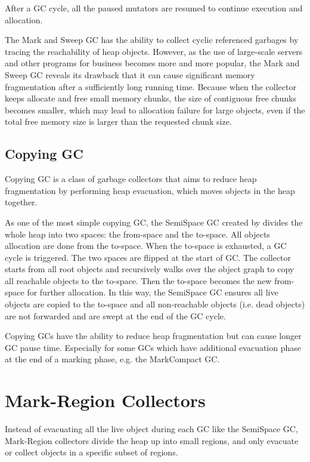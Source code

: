 After a GC cycle, all the paused mutators are resumed to continue execution and allocation.

The Mark and Sweep GC has the ability to collect cyclic referenced garbages by tracing
the reachability of heap objects. However, as the use of large-scale servers and
other programs for business becomes more and more popular, the Mark and Sweep GC 
reveals its drawback that it can cause significant memory fragmentation after a
sufficiently long running time. Because when the collector keeps allocate and free
small memory chunks, the size of contiguous free chunks becomes smaller, which may
lead to allocation failure for large objects, even if the total free memory size
is larger than the requested chunk size.

\subsection{Copying GC}

Copying GC is a class of garbage collectors that aims to reduce heap fragmentation
by performing heap evacuation, which moves objects in the heap together.

As one of the most simple copying GC, the SemiSpace GC created by \cite{fenichel1969lisp} divides the whole heap
into two spaces: the from-space and the to-space. All objects allocation are done
from the to-space. When the to-space is exhausted, a GC cycle is triggered.
The two spaces are flipped at the start of GC.
The collector starts from all root objects and recursively walks over the
object graph to copy all reachable objects to the to-space. Then the to-space becomes
the new from-space for further allocation. In this way, the SemiSpace GC ensures all
live objects are copied to the to-space and all non-reachable objects (i.e. dead objects)
are not forwarded and are swept at the end of the GC cycle.

Copying GCs have the ability to reduce heap fragmentation but can cause longer
GC pause time. Especially for some GCs which have additional evacuation
phase at the end of a marking phase, e.g. the MarkCompact GC.

\section{Mark-Region Collectors}

Instead of evacuating all the live object during each GC like the SemiSpace GC,
Mark-Region collectors divide the heap up into small regions, and only evacuate
or collect objects in a specific subset of regions.

